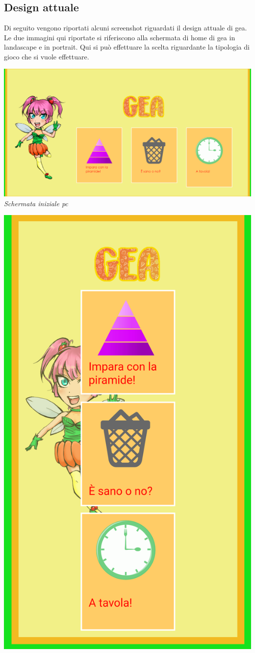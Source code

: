 \subsection{Design attuale}
Di seguito vengono riportati alcuni screenshot riguardati il design attuale di \acs{gea}.\\
Le due immagini qui riportate si riferiscono alla schermata di home di \acs{gea} in landascape e in portrait. Qui si può effettuare la scelta riguardante la tipologia di gioco che si vuole effettuare.

\begin{center}
\begin{minipage}[c]{.40\textwidth}
\centering
\includegraphics[width=.70\textwidth]{Images/Design/Game}\\
\vspace{10px}
\emph{Schermata iniziale pc}\bigskip
\end{minipage}
\hspace{10mm}
\begin{minipage}[c]{.40\textwidth}
\centering
\includegraphics[width=.70\textwidth]{Images/Design/Homesmartphone}\\

\end{minipage}
\end{center}
